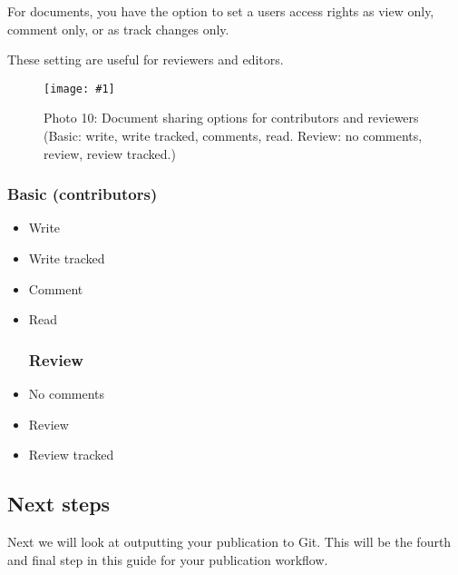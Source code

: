 \documentclass{article}
\newlength{\imgwidth}
\newcommand\scaledgraphics[2]{%
                
\settowidth{\imgwidth}{\texttt{[image: \#1]}}%
                
\setlength{\imgwidth}{\minof{\imgwidth}{#2\textwidth}}%
                
\texttt{[image: \#1]}%
                
}
\begin{document}
For documents, you have the option to set a users access rights as view only, comment only, or as track changes only.


These setting are useful for reviewers and editors.

\begin{figure}
\scaledgraphics{c9b1abcb-0015-4636-b6e0-d679a5618852.png}{1}
\caption*{Photo 10: Document sharing options for contributors and reviewers (Basic: write, write tracked, comments, read. Review: no comments, review, review tracked.)}\label{F15312041}
\end{figure}


\subsubsection{Basic (contributors)}\label{H7032777}


\begin{itemize}
\item Write


\item Write tracked


\item Comment


\item Read


\subsubsection{Review}\label{H2377842}



\item No comments


\item Review


\item Review tracked


\end{itemize}

\subsection{Next steps}\label{H4422568}



Next we will look at outputting your publication to Git. This will be the fourth and final step in this guide for your publication workflow.
\end{document}
